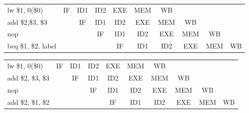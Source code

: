 \documentclass[pdftex,12pt,a4paper]{report}
\begin{document}
\begin{table}[!htb]
\centering
\label{my-label}
\begin{tabular}{lccc|c|c|c|ccc}
\cline{2-7}
\multicolumn{1}{l|}{lw \$1, 0(\$0)} & \multicolumn{1}{c|}{IF} & \multicolumn{1}{c|}{ID1} & ID2 & EXE & \cellcolor[HTML]{F8A102}MEM & \cellcolor[HTML]{FFCC67}WB  &                          &                          &                         \\ \cline{2-8}
add \$2,\$3, \$3                   & \multicolumn{1}{c|}{}   & \multicolumn{1}{c|}{IF}  & ID1 & ID2 & \cellcolor[HTML]{F8A102}EXE & \cellcolor[HTML]{FFCC67}MEM & \multicolumn{1}{c|}{WB}  &                          &                         \\ \cline{3-9}
nop                               &                         & \multicolumn{1}{c|}{}    & IF  & ID1 & ID2                         & EXE                         & \multicolumn{1}{c|}{MEM} & \multicolumn{1}{c|}{WB}  &                         \\ \cline{4-10} 
beq \$1, \$2, label                 &                         &                          &     & IF  & ID1                         & \cellcolor[HTML]{F8A102}ID2 & \multicolumn{1}{c|}{EXE} & \multicolumn{1}{c|}{MEM} & \multicolumn{1}{c|}{WB} \\ \cline{5-10} 
\end{tabular}
\end{table}

\begin{table}[!htb]
\centering
\label{my-label}
\begin{tabular}{lccc|c|c|c|ccc}
\cline{2-7}
\multicolumn{1}{l|}{lw \$1, 0(\$0)} & \multicolumn{1}{c|}{IF} & \multicolumn{1}{c|}{ID1} & ID2 & EXE & \cellcolor[HTML]{F8A102}MEM & \cellcolor[HTML]{FFCC67}WB  &                          &                          &                         \\ \cline{2-8}
add \$2, \$3, \$3                   & \multicolumn{1}{c|}{}   & \multicolumn{1}{c|}{IF}  & ID1 & ID2 & EXE & MEM & \multicolumn{1}{c|}{WB}  &                          &                         \\ \cline{3-9}
nop                               &                         & \multicolumn{1}{c|}{}    & IF  & ID1 & ID2                         & EXE                         & \multicolumn{1}{c|}{MEM} & \multicolumn{1}{c|}{WB}  &                         \\ \cline{4-10} 
add \$2, \$1, \$2                   &                         &                          &     & IF  & ID1                         & \cellcolor[HTML]{F8A102}ID2 & \multicolumn{1}{c|}{EXE} & \multicolumn{1}{c|}{MEM} & \multicolumn{1}{c|}{WB} \\ \cline{5-10} 
\end{tabular}
\end{table}
\end{document}
